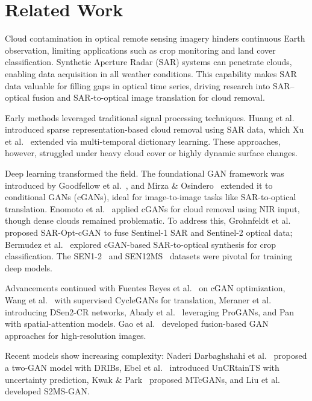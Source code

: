 \section{Related Work}\label{relatedWork}

Cloud contamination in optical remote sensing imagery hinders continuous Earth observation, limiting applications such as crop monitoring and land cover classification. Synthetic Aperture Radar (SAR) systems can penetrate clouds, enabling data acquisition in all weather conditions. This capability makes SAR data valuable for filling gaps in optical time series, driving research into SAR–optical fusion and SAR-to-optical image translation for cloud removal.

Early methods leveraged traditional signal processing techniques. Huang et al.~\cite{huang2015} introduced sparse representation-based cloud removal using SAR data, which Xu et al.~\cite{xu2016} extended via multi-temporal dictionary learning. These approaches, however, struggled under heavy cloud cover or highly dynamic surface changes.

Deep learning transformed the field. The foundational GAN framework was introduced by Goodfellow et al.~\cite{goodfellow2014}, and Mirza \& Osindero~\cite{mirza2014} extended it to conditional GANs (cGANs), ideal for image-to-image tasks like SAR-to-optical translation. Enomoto et al.~\cite{enomoto2017} applied cGANs for cloud removal using NIR input, though dense clouds remained problematic. To address this, Grohnfeldt et al.~\cite{grohnfeldt2018} proposed SAR-Opt-cGAN to fuse Sentinel-1 SAR and Sentinel-2 optical data; Bermudez et al.~\cite{bermudez2018} explored cGAN-based SAR-to-optical synthesis for crop classification. The SEN1-2~\cite{schmitt2018} and SEN12MS~\cite{schmitt2019} datasets were pivotal for training deep models.

Advancements continued with Fuentes Reyes et al.~\cite{fuentes2019} on cGAN optimization, Wang et al.~\cite{wang2019} with supervised CycleGANs for translation, Meraner et al.~\cite{meraner2020} introducing DSen2-CR networks, Abady et al.~\cite{abady2020} leveraging ProGANs, and Pan~\cite{pan2020} with spatial-attention models. Gao et al.~\cite{gao2020} developed fusion-based GAN approaches for high-resolution images.

Recent models show increasing complexity: Naderi Darbaghshahi et al.~\cite{naderi2021} proposed a two-GAN model with DRIBs, Ebel et al.~\cite{ebel2022} introduced UnCRtainTS with uncertainty prediction, Kwak \& Park~\cite{kwak2024} proposed MTcGANs, and Liu et al.~\cite{liu2024} developed S2MS-GAN.

